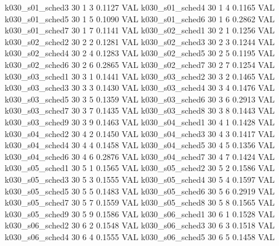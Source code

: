   k030_s01_sched3                   30    1   3    0.1127  VAL
  k030_s01_sched4                   30    1   4    0.1165  VAL
  k030_s01_sched5                   30    1   5    0.1090  VAL
  k030_s01_sched6                   30    1   6    0.2862  VAL
  k030_s01_sched7                   30    1   7    0.1141  VAL
  k030_s02_sched1                   30    2   1    0.1256  VAL
  k030_s02_sched2                   30    2   2    0.1281  VAL
  k030_s02_sched3                   30    2   3    0.1244  VAL
  k030_s02_sched4                   30    2   4    0.1283  VAL
  k030_s02_sched5                   30    2   5    0.1195  VAL
  k030_s02_sched6                   30    2   6    0.2865  VAL
  k030_s02_sched7                   30    2   7    0.1254  VAL
  k030_s03_sched1                   30    3   1    0.1441  VAL
  k030_s03_sched2                   30    3   2    0.1465  VAL
  k030_s03_sched3                   30    3   3    0.1430  VAL
  k030_s03_sched4                   30    3   4    0.1476  VAL
  k030_s03_sched5                   30    3   5    0.1359  VAL
  k030_s03_sched6                   30    3   6    0.2913  VAL
  k030_s03_sched7                   30    3   7    0.1435  VAL
  k030_s03_sched8                   30    3   8    0.1443  VAL
  k030_s03_sched9                   30    3   9    0.1463  VAL
  k030_s04_sched1                   30    4   1    0.1428  VAL
  k030_s04_sched2                   30    4   2    0.1450  VAL
  k030_s04_sched3                   30    4   3    0.1417  VAL
  k030_s04_sched4                   30    4   4    0.1458  VAL
  k030_s04_sched5                   30    4   5    0.1356  VAL
  k030_s04_sched6                   30    4   6    0.2876  VAL
  k030_s04_sched7                   30    4   7    0.1424  VAL
  k030_s05_sched1                   30    5   1    0.1565  VAL
  k030_s05_sched2                   30    5   2    0.1586  VAL
  k030_s05_sched3                   30    5   3    0.1555  VAL
  k030_s05_sched4                   30    5   4    0.1597  VAL
  k030_s05_sched5                   30    5   5    0.1483  VAL
  k030_s05_sched6                   30    5   6    0.2919  VAL
  k030_s05_sched7                   30    5   7    0.1559  VAL
  k030_s05_sched8                   30    5   8    0.1565  VAL
  k030_s05_sched9                   30    5   9    0.1586  VAL
  k030_s06_sched1                   30    6   1    0.1528  VAL
  k030_s06_sched2                   30    6   2    0.1548  VAL
  k030_s06_sched3                   30    6   3    0.1518  VAL
  k030_s06_sched4                   30    6   4    0.1555  VAL
  k030_s06_sched5                   30    6   5    0.1458  VAL
